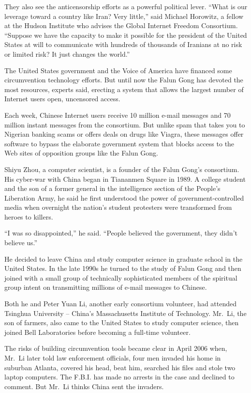\documentclass[12pt,a4paper,onecolumn]{article}
\begin{document}
They also see the anticensorship efforts as a powerful political lever. ``What is our leverage
toward a country like Iran? Very little,'' said Michael Horowitz, a fellow at the Hudson Institute
who advises the Global Internet Freedom Consortium. ``Suppose we have the capacity to make it
possible for the president of the United States at will to communicate with hundreds of thousands of
Iranians at no risk or limited risk? It just changes the world.''

The United States government and the Voice of America have financed some circumvention technology
efforts. But until now the Falun Gong has devoted the most resources, experts said, erecting a
system that allows the largest number of Internet users open, uncensored access.

Each week, Chinese Internet users receive 10 million e-mail messages and 70 million instant messages
from the consortium. But unlike spam that takes you to Nigerian banking scams or offers deals on
drugs like Viagra, these messages offer software to bypass the elaborate government system that
blocks access to the Web sites of opposition groups like the Falun Gong.

Shiyu Zhou, a computer scientist, is a founder of the Falun Gong's consortium. His cyber-war with
China began in Tiananmen Square in 1989. A college student and the son of a former general in the
intelligence section of the People's Liberation Army, he said he first understood the power of
government-controlled media when overnight the nation's student protesters were transformed from
heroes to killers.

``I was so disappointed,'' he said. ``People believed the government, they didn't believe us.''

He decided to leave China and study computer science in graduate school in the United States. In the
late 1990s he turned to the study of Falun Gong and then joined with a small group of technically
sophisticated members of the spiritual group intent on transmitting millions of e-mail messages to
Chinese.

Both he and Peter Yuan Li, another early consortium volunteer, had attended Tsinghua University --
China's Massachusetts Institute of Technology. Mr.~Li, the son of farmers, also came to the United
States to study computer science, then joined Bell Laboratories before becoming a full-time
volunteer.

The risks of building circumvention tools became clear in April 2006 when, Mr.~Li later told law
enforcement officials, four men invaded his home in suburban Atlanta, covered his head, beat him,
searched his files and stole two laptop computers. The F.B.I. has made no arrests in the case and
declined to comment. But Mr.~Li thinks China sent the invaders.
\end{document}
